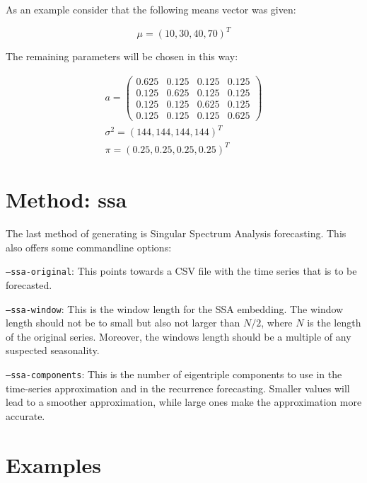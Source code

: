 As an example consider that the following means vector was given: 

\begin{equation}
    \mu = (10, 30, 40, 70)^T
\end{equation}

The remaining parameters will be chosen in this way:

\begin{equation}
    \begin{split}
    a = 
    \begin{pmatrix}
        0.625 & 0.125 & 0.125 & 0.125 \\
        0.125 & 0.625 & 0.125 & 0.125 \\
        0.125 & 0.125 & 0.625 & 0.125 \\
        0.125 & 0.125 & 0.125 & 0.625
    \end{pmatrix} \\
    \sigma^2 = (144, 144, 144, 144)^T \\
    \pi = (0.25, 0.25, 0.25, 0.25)^T 
\end{split}
\end{equation}

\section{Method: ssa}

The last method of generating is Singular Spectrum Analysis forecasting. This also offers some commandline options: 

\texttt{---ssa-original}: This points towards a CSV file with the time series that is to be forecasted. 

\texttt{---ssa-window}: This is the window length for the SSA embedding. The window length should not be to small but also not larger than $N/2$, where $N$ is the length of the original series. Moreover, the windows length should be a multiple of any suspected seasonality.

\texttt{---ssa-components}: This is the number of eigentriple components to use in the time-series approximation and in the recurrence forecasting. Smaller values will lead to a smoother approximation, while large ones make the approximation more accurate. 

\section{Examples}

